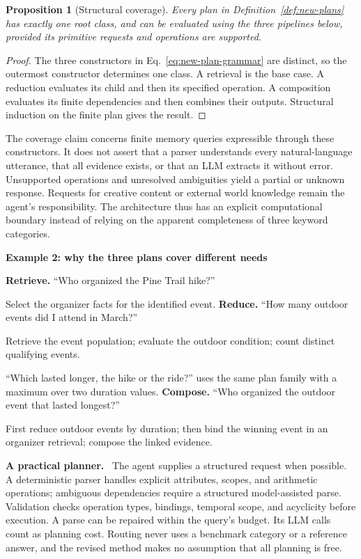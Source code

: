\documentclass[10pt,twocolumn]{article}
\newcommand{\runin}[1]{\smallskip\noindent\textbf{#1.}\ }
\newtheorem{proposition}{Proposition}
\newenvironment{memoryexample}[1]{%
  \def\FrameCommand{\fboxrule=0.7pt\fboxsep=6pt\fbox}%
  \begin{framed}\small\noindent\textbf{#1}\par\smallskip
}{\end{framed}}
\begin{document}
\begin{proposition}[Structural coverage]
\label{prop:new-coverage}
Every plan in Definition~\ref{def:new-plans} has exactly one root class,
and can be evaluated using the three pipelines below, provided its
primitive requests and operations are supported.
\end{proposition}
\begin{proof}
The three constructors in Eq.~\eqref{eq:new-plan-grammar} are distinct,
so the outermost constructor determines one class. A retrieval is the
base case. A reduction evaluates its child and then its specified
operation. A composition evaluates its finite dependencies and then
combines their outputs. Structural induction on the finite plan gives
the result.
\end{proof}

The coverage claim concerns finite memory queries expressible through
these constructors. It does not assert that a parser understands every
natural-language utterance, that all evidence exists, or that an LLM
extracts it without error. Unsupported operations and unresolved
ambiguities yield a partial or unknown response. Requests for creative
content or external world knowledge remain the agent's responsibility.
The architecture thus has an explicit computational boundary instead
of relying on the apparent completeness of three keyword categories.

\begin{memoryexample}{Example 2: why the three plans cover different needs}
\textbf{Retrieve.} ``Who organized the Pine Trail hike?''
\par Select the organizer facts for the identified event.
\smallskip
\textbf{Reduce.} ``How many outdoor events did I attend in March?''
\par Retrieve the event population; evaluate the outdoor condition;
count distinct qualifying events.
\par ``Which lasted longer, the hike or the ride?'' uses the same plan
family with a maximum over two duration values.
\smallskip
\textbf{Compose.} ``Who organized the outdoor event that lasted longest?''
\par First reduce outdoor events by duration; then bind the winning
event in an organizer retrieval; compose the linked evidence.
\end{memoryexample}

\runin{A practical planner}
The agent supplies a structured request when possible. A deterministic
parser handles explicit attributes, scopes, and arithmetic operations;
ambiguous dependencies require a structured model-assisted parse.
Validation checks operation types, bindings, temporal scope, and
acyclicity before execution. A parse can be repaired within the query's
budget. Its LLM calls count as planning cost. Routing never uses a
benchmark category or a reference answer, and the revised method makes
no assumption that all planning is free.
\end{document}
